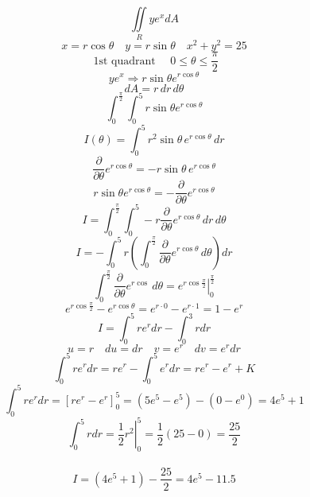 \documentclass{report}
\begin{document}
{\begin{center}
    \end{center}
    \[ \iint\limits_{R} ye^{x} dA \]
    \[ x = r \cos \theta \quad y = r \sin \theta \quad x^{2} + y^{2} = 25 \]
    \[ \text{ 1st quadrant } \quad 0 \leq \theta \leq \frac{\pi}{2} \]
    \[ ye^{x} \Rightarrow r \sin \theta e ^{r \cos \theta } \]
    \[ dA = r \, dr \, d\theta \]
    \[ \int_{0}^{\frac{\pi}{2}} \int_{0}^{5} r \sin \theta e^{r \cos \theta }\] 
    \[  I(\theta) = \int_{0}^{5} r^{2} \sin \theta \, e^{r \cos \theta} \, dr \] 
    \[ \frac{\partial}{\partial \theta} e^{r \cos \theta} = -r \sin \theta \, e^{r \cos \theta} \]
    \[ r \sin \theta e^{r \cos \theta} = - \frac{\partial}{\partial \theta} e^{r \cos \theta} \]
    \[ I = \int_{0}^{\frac{\pi}{2}} \int_{0}^{5} - r \frac{\partial}{\partial \theta} e^{r \cos \theta} \, dr \, d\theta \]
    \[ I = - \int_{0}^{5} r \left( \int_{0}^{\frac{\pi}{2}} \frac{\partial }{\partial \theta} e^{r \cos \theta} \, d\theta \right) dr \]
    \[ \int_{0}^{\frac{\pi}{2}} \frac{\partial}{\partial \theta} e^{r \cos } \, d \theta = \left. e^{r \cos \frac{\pi}{2}} \right|_{0}^{\frac{\pi}{2}} \] 
    \[ e^{r \cos \frac{\pi}{2}} - e^{r \cos \theta} = e^{r \cdot 0} - e^{r \cdot 1} = 1 - e^{r} \] 
    \[ I = \int_{0}^{5} re^{r} dr - \int_{0}^{3} r dr \]
    \[ u = r \quad du = dr \quad v = e^{r} \quad dv = e^{r} dr \]
    \[ \int_{0}^{5} re^{r} dr = re^{r} - \int_{0}^{5} e^{r} dr = re^{r} -e^{r} + K \]
    \[ \int_{0}^{5} re^{r} dr = \left[ re^{r} - e^{r} \right]_{0}^{5} = \left( 5e^{5} - e^{5} \right) - (0 - e^{0}) = 4e^{5} + 1 \]
    \[ \int_{0}^{5} r dr = \left. \frac{1}{2}r^{2} \right|_{0}^{5} = \frac{1}{2} (25 - 0 ) = \frac{25}{2} \] \
    \[ I = (4e^{5} + 1) - \frac{25}{2} = 4e^{5} - 11.5  \]              
}

\newpage 

\end{document}

